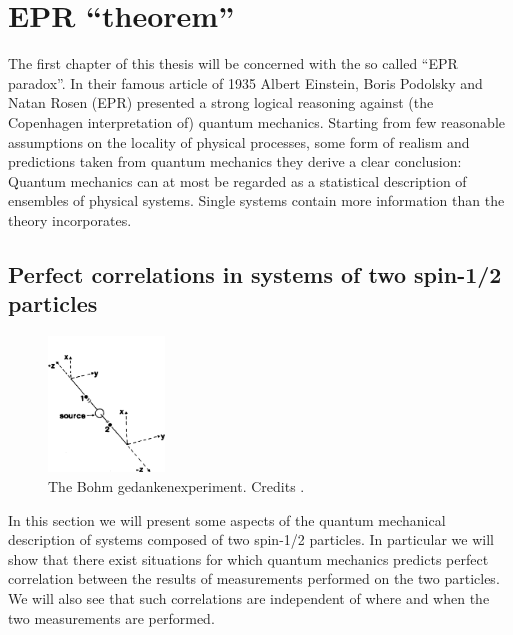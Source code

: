 \chapter{EPR ``theorem''}
\label{chap:epr}
The first chapter of this thesis will be concerned with the so called ``EPR paradox''. In their famous article of 1935 \cite{PhysRev.47.777} Albert Einstein, Boris Podolsky and Natan Rosen (EPR) presented a strong logical reasoning against (the Copenhagen interpretation of) quantum mechanics. Starting from few reasonable assumptions on the locality of physical processes, some form of realism and predictions taken from quantum mechanics they derive a clear conclusion: Quantum mechanics can at most be regarded as a statistical description of ensembles of physical systems. Single systems contain more information than the theory incorporates.%


\section{Perfect correlations in systems of two spin-1/2 particles}
\label{sec:two-spin1/2}

\begin{figure}
  \centering
  \includegraphics[width=0.275\textwidth]{Mainmatter/Chapter1/eprb-gedankenexperiment.png}
  \caption{The Bohm gedankenexperiment. Credits \cite{:/content/aapt/journal/ajp/58/12/10.1119/1.16243}.}
  \label{fig:eprb-gedankenexperiment}
\end{figure}

In this section we will present some aspects of the quantum mechanical description of systems composed of two spin-1/2 particles. In particular we will show that there exist situations for which quantum mechanics predicts perfect correlation between the results of measurements performed on the two particles. We will also see that such correlations are independent of where and when the two measurements are performed.%

